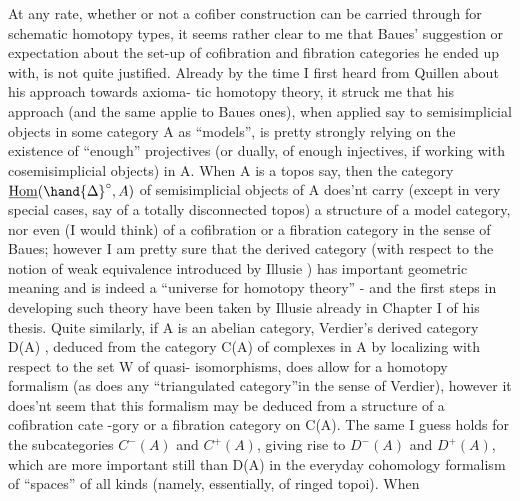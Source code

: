 At any rate,  whether or not a  cofiber construction  can be carried
through for schematic homotopy types,  it seems rather clear to me that
Baues' suggestion or expectation\hand{,} about the set-up of cofibration and
fibration categories he ended up with,  is not quite justified.  Already
by the time  I first heard from Quillen about his approach towards axioma-%
tic homotopy theory,  it struck me that his approach (and the same applie
to Baues ones),   when applied say to semisimplicial objects in some
category A as ``models'',  is pretty strongly relying on the existence of
``enough'' projectives (or dually,  of enough injectives,  if working with
cosemisimplicial objects) in A.  When A is a topos say,  then the
category $\underline{\mathrm{Hom}}(\hand{\Delta}^{\circ},A)$ of semisimplicial objects of A does'nt carry 
(except in very special cases,  say of a totally disconnected topos) a
structure of a  model category,  nor even (I would think) of a
cofibration or a fibration category in the sense of Baues;  however I am
pretty sure that the derived category   (with respect to the
\margin{$\times$} notion of  weak equivalence introduced by Illusie \hand{[\quad]})  has important
geometric meaning and is indeed a ``universe for homotopy theory''  - and
the first steps in developing such theory have been taken by Illusie
already in Chapter I of his thesis.  Quite similarly,  if A is an abelian
category,  Verdier's derived category  D(A) , deduced from the category
C(A) of complexes in A by localizing with respect to the set W of quasi-%
isomorphisms,   does allow for a homotopy formalism (as does any
``triangulated category''in the sense of Verdier),  however it does'nt seem
that this formalism may be deduced from a structure of a cofibration cate
-gory or a fibration category on C(A).   The same I guess holds for the
 subcategories $C^{-}(A)$ and $C^{+}(A)$,  giving rise to $D^{-}(A)$ and $D^{+}(A)$,  which
are more important still than D(A) in the everyday cohomology formalism
of ``spaces'' of all kinds (namely,  essentially,  of ringed topoi).  When

